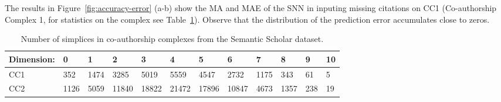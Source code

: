 The results in Figure~\ref{fig:accuracy-error} (a-b) show the MA and MAE of the SNN in inputing missing citations on CC1 (Co-authorship Complex 1, for statistics on the complex see Table~\ref{table:Simplices-coauthor}). Observe that the distribution of the prediction error accumulates close to zeros.
\begin{table}[htbp]
  \centering
  \scriptsize{
  \begin{tabular}{llllllllllll}
    \cmidrule(r){1-12}
    Dimension:   & 0     & 1  & 2     & 3 & 4     & 5 & 6    & 7 & 8   & 9 & 10\\
    \midrule
    CC1 & 352  & 1474  & 3285  & 5019  & 5559  & 4547  & 2732  & 1175  & 343 & 61 & 5\\
    CC2 & 1126 & 5059 & 11840 & 18822 & 21472 & 17896  & 10847 & 4673 & 1357 & 238 & 19\\ 
    \bottomrule
  \end{tabular}}
  \vspace{2pt}
  \caption{%
  Number of simplices in co-authorship complexes from the Semantic Scholar dataset.
  } \label{table:Simplices-coauthor}
\end{table}
